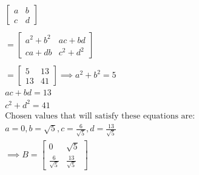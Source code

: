 \documentclass[oneside, a4paper]{article}
\begin{document}
\begin{equation}
\begin{split}
\begin{bmatrix}
                a & b \\
                c & d 
            \end{bmatrix} \\ \\
        = 
            \begin{bmatrix}
                a^2 + b^2 & ac + bd \\
                ca + db & c^2 + d^2 
            \end{bmatrix} \\ \\
        = 
            \begin{bmatrix}
                5 & 13 \\
                13 & 41 
            \end{bmatrix} 
        \implies a^2 + b^2 = 5\\
        ac + bd = 13 \\
        c^2 + d^2 = 41 \\
        \text{Chosen values that will satisfy these equations are: } \\
        a = 0, b = \sqrt{5}, c = \frac{6}{\sqrt{5}}, d = \frac{13}{\sqrt{5}} \\
        \implies B = 
            \begin{bmatrix}
                0 & \sqrt{5} \\
                \frac{6}{\sqrt{5}} & \frac{13}{\sqrt{5}}
            \end{bmatrix} 
    \end{split}
\end{equation}
\end{document}
